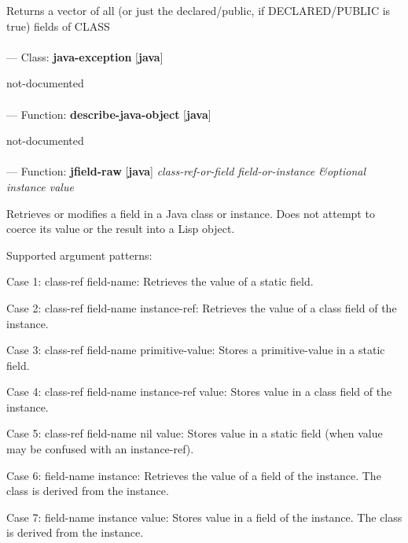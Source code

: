 \begin{adjustwidth}{5em}{5em}
Returns a vector of all (or just the declared/public, if DECLARED/PUBLIC is true) fields of CLASS
\end{adjustwidth}

\paragraph{}
\label{JAVA:JAVA-EXCEPTION}
--- Class: \textbf{java-exception} [\textbf{java}] \textit{}

\begin{adjustwidth}{5em}{5em}
not-documented
\end{adjustwidth}

\paragraph{}
\label{JAVA:DESCRIBE-JAVA-OBJECT}
--- Function: \textbf{describe-java-object} [\textbf{java}] \textit{}

\begin{adjustwidth}{5em}{5em}
not-documented
\end{adjustwidth}

\paragraph{}
\label{JAVA:JFIELD-RAW}
--- Function: \textbf{jfield-raw} [\textbf{java}] \textit{class-ref-or-field field-or-instance \&optional instance value}

\begin{adjustwidth}{5em}{5em}
Retrieves or modifies a field in a Java class or instance. Does not
attempt to coerce its value or the result into a Lisp object.

Supported argument patterns:

   Case 1: class-ref  field-name:
      Retrieves the value of a static field.

   Case 2: class-ref  field-name  instance-ref:
      Retrieves the value of a class field of the instance.

   Case 3: class-ref  field-name  primitive-value:
      Stores a primitive-value in a static field.

   Case 4: class-ref  field-name  instance-ref  value:
      Stores value in a class field of the instance.

   Case 5: class-ref  field-name  nil  value:
      Stores value in a static field (when value may be
      confused with an instance-ref).

   Case 6: field-name  instance:
      Retrieves the value of a field of the instance. The
      class is derived from the instance.

   Case 7: field-name  instance  value:
      Stores value in a field of the instance. The class is
      derived from the instance.


\end{adjustwidth}

